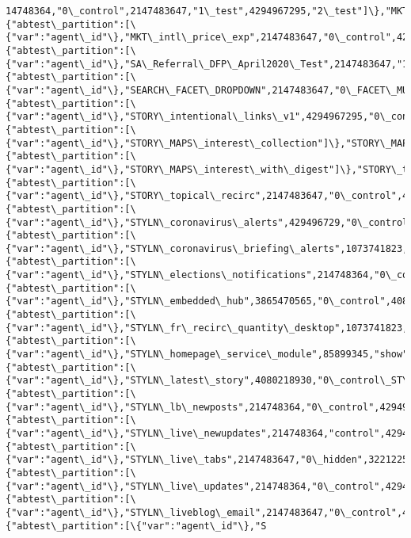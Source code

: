 \documentclass[11pt]{article}
\begin{document}
\begin{Verbatim}[commandchars=\\\{\}]
14748364,"0\_control",2147483647,"1\_test",4294967295,"2\_test"]\},"MKT\_intl\_price\_exp":\{"abtest\_partition":[\{"var":"agent\_id"\},"MKT\_intl\_price\_exp",2147483647,"0\_control",4294967295,"1\_monthly\_exp"]\},"SA\_Referral\_DFP\_April2020\_Test":\{"abtest\_partition":[\{"var":"agent\_id"\},"SA\_Referral\_DFP\_April2020\_Test",2147483647,"1\_yellow\_evergreen",4294967295,"2\_yellow\_moment"]\},"SEARCH\_FACET\_DROPDOWN":\{"abtest\_partition":[\{"var":"agent\_id"\},"SEARCH\_FACET\_DROPDOWN",2147483647,"0\_FACET\_MULTI\_SELECT",4294967295,"1\_DYNAMIC\_FACET\_SELECT"]\},"STORY\_intentional\_links\_v1":\{"abtest\_partition":[\{"var":"agent\_id"\},"STORY\_intentional\_links\_v1",4294967295,"0\_control"]\},"STORY\_MAPS\_interest\_collection":\{"abtest\_partition":[\{"var":"agent\_id"\},"STORY\_MAPS\_interest\_collection"]\},"STORY\_MAPS\_interest\_with\_digest":\{"abtest\_partition":[\{"var":"agent\_id"\},"STORY\_MAPS\_interest\_with\_digest"]\},"STORY\_topical\_recirc":\{"abtest\_partition":[\{"var":"agent\_id"\},"STORY\_topical\_recirc",2147483647,"0\_control",4294967295,"1\_variant"]\},"STYLN\_coronavirus\_alerts":\{"abtest\_partition":[\{"var":"agent\_id"\},"STYLN\_coronavirus\_alerts",429496729,"0\_control",858993458,"1\_coronavirus\_alerts"]\},"STYLN\_coronavirus\_briefing\_alerts":\{"abtest\_partition":[\{"var":"agent\_id"\},"STYLN\_coronavirus\_briefing\_alerts",1073741823,"control",3221225471,"variant",3578996247,"control",4294967295,"variant"]\},"STYLN\_elections\_notifications":\{"abtest\_partition":[\{"var":"agent\_id"\},"STYLN\_elections\_notifications",214748364,"0\_control",4294967295,"1\_elections\_notifications"]\},"STYLN\_embedded\_hub":\{"abtest\_partition":[\{"var":"agent\_id"\},"STYLN\_embedded\_hub",3865470565,"0\_control",4080218930,"1\_modal",4294967295,"2\_footer"]\},"STYLN\_fr\_recirc\_quantity\_desktop":\{"abtest\_partition":[\{"var":"agent\_id"\},"STYLN\_fr\_recirc\_quantity\_desktop",1073741823,"0\_control\_fr\_recirc\_quantity\_desktop",2147483647,"1\_fr\_recirc\_quantity\_desktop",3221225471,"2\_fr\_recirc\_quantity\_desktop",4294967295,"3\_fr\_recirc\_quantity\_desktop"]\},"STYLN\_homepage\_service\_module":\{"abtest\_partition":[\{"var":"agent\_id"\},"STYLN\_homepage\_service\_module",85899345,"show",171798691,"hide"]\},"STYLN\_latest\_story":\{"abtest\_partition":[\{"var":"agent\_id"\},"STYLN\_latest\_story",4080218930,"0\_control\_STYLN\_latest\_story",4294967295,"1\_latest\_story"]\},"STYLN\_lb\_newposts":\{"abtest\_partition":[\{"var":"agent\_id"\},"STYLN\_lb\_newposts",214748364,"0\_control",4294967295,"1\_lb\_newposts"]\},"STYLN\_live\_newupdates":\{"abtest\_partition":[\{"var":"agent\_id"\},"STYLN\_live\_newupdates",214748364,"control",4294967295,"variant"]\},"STYLN\_live\_tabs":\{"abtest\_partition":[\{"var":"agent\_id"\},"STYLN\_live\_tabs",2147483647,"0\_hidden",3221225471,"1\_menu",4294967295,"2\_body"]\},"STYLN\_live\_updates":\{"abtest\_partition":[\{"var":"agent\_id"\},"STYLN\_live\_updates",214748364,"0\_control",429496729,"2\_live\_updates",4294967295,"1\_live\_updates"]\},"STYLN\_liveblog\_email":\{"abtest\_partition":[\{"var":"agent\_id"\},"STYLN\_liveblog\_email",2147483647,"0\_control",4294967295,"1\_signup"]\},"STYLN\_pharmacy\_components":\{"abtest\_partition":[\{"var":"agent\_id"\},"S
\end{Verbatim}
\end{document}
